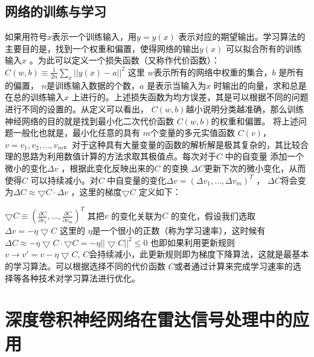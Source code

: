 \subsection{网络的训练与学习}
如果用符号$x $表示一个训练输入，用$y=y(x) $ 表示对应的期望输出。学习算法的主要目的是，找到一个权重和偏置，使得网络的输出$y(x) $ 可以拟合所有的训练输入$x$ 。为此可以定义一个损失函数（又称作代价函数）：
$C(w,b)\equiv \frac{1}{2n}\sum_x||y(x)-a||^2 $
这里 $w$表示所有的网络中权重的集合，$b$ 是所有的偏置， $n$是训练输入数据的个数，$a$ 是表示当输入为$x$ 时输出的向量，求和总是在总的训练输入$x$ 上进行的。上述损失函数为均方误差，其是可以根据不同的问题进行不同的设置的。从定义可以看出， $C(w,b) $越小说明分类越准确，那么训练神经网络的目的就是找到最小化二次代价函数 $C(w,b) $的权重和偏置。
将上述问题一般化也就是，最小化任意的具有 $m $个变量的多元实值函数 $C(v) $， $v=v_1,v_2,\dots,v_m $。对于这种具有大量变量的函数的解析解是极其复杂的，其比较合理的思路为利用数值计算的方法求取其极值点。每次对于$C $ 中的自变量 添加一个微小的变化$\Delta v $ ，根据此变化反映出来的$C $ 的变换 $\Delta C $更新下次的微小变化，从而使得$C $ 可以持续减小。对$C $ 中自变量的变化$\Delta v=(\Delta v_1,\dots,\Delta v_m)^T $ ， $\Delta C $将会变为$\Delta C \approx \bigtriangledown C \cdot \Delta v $ ，这里的梯度$\bigtriangledown C $ 定义如下：

$\bigtriangledown C \equiv (\frac{\partial C}{\partial v_1},\dots,\frac{\partial C}{\partial v_m})^T $
其把$v $ 的变化关联为$C$ 的变化，假设我们选取
$\Delta v=-\eta \bigtriangledown C $
这里的 $\eta $是一个很小的正数（称为学习速率），这时候有
$\Delta C \approx -\eta\bigtriangledown C\cdot\bigtriangledown C=-\eta||\bigtriangledown C||^2 \leq 0$
也即如果利用更新规则
$v \rightarrow v'=v-\eta \bigtriangledown C$,
$C $会持续减小，此更新规则即为梯度下降算法，这就是最基本的学习算法。可以根据选择不同的代价函数 $C $或者通过计算来完成学习速率的选择等各种技术对学习算法进行优化。

\section{深度卷积神经网络在雷达信号处理中的应用}